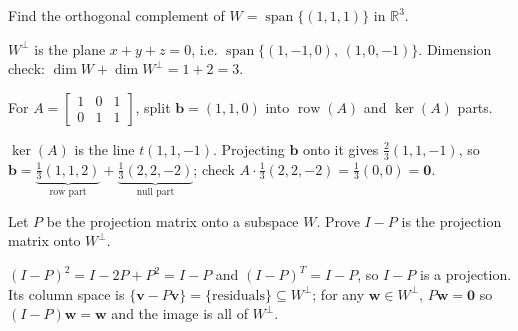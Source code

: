 \begin{exercise}[medium]\label{ex:orth-2}
Find the orthogonal complement of $W=\operatorname{span}\{(1,1,1)\}$ in
$\mathbb R^3$.
\begin{solution}
$W^\perp$ is the plane $x+y+z=0$, i.e.
$\operatorname{span}\{(1,-1,0),\,(1,0,-1)\}$. Dimension check:
$\dim W+\dim W^\perp=1+2=3$.
\end{solution}
\end{exercise}

\begin{exercise}[medium]\label{ex:orth-3}
For $A=\begin{bmatrix}1&0&1\\0&1&1\end{bmatrix}$, split
$\mathbf b=(1,1,0)$ into $\operatorname{row}(A)$ and $\ker(A)$ parts.
\begin{solution}
$\ker(A)$ is the line $t(1,1,-1)$. Projecting $\mathbf b$ onto it gives
$\frac{2}{3}(1,1,-1)$, so
$\mathbf b=\underbrace{\tfrac13(1,1,2)}_{\text{row part}}
+\underbrace{\tfrac13(2,2,-2)}_{\text{null part}}$; check
$A\cdot\frac13(2,2,-2)=\frac13(0,0)=\mathbf0$. \checkmark
\end{solution}
\end{exercise}

\begin{exercise}[hard]\label{ex:orth-4}
Let $P$ be the projection matrix onto a subspace $W$. Prove $I-P$ is the
projection matrix onto $W^\perp$.
\begin{solution}
$(I-P)^2=I-2P+P^2=I-P$ and $(I-P)^{T}=I-P$, so $I-P$ is a projection.
Its column space is $\{\mathbf v-P\mathbf v\}=\{\text{residuals}\}\subseteq W^\perp$;
for any $\mathbf w\in W^\perp$, $P\mathbf w=\mathbf0$ so
$(I-P)\mathbf w=\mathbf w$ and the image is all of $W^\perp$.
\end{solution}
\end{exercise}

